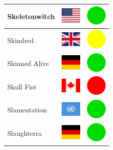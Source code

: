 \documentclass[12pt, a4paper, twoside]{report}
\begin{document}
\begin{center}
\begin{longtable}{|p{5cm}|p{2cm}|p{2cm}|}
 Skeletonwitch                                              & \includegraphics[width=1cm]{4x3/us} &   \includegraphics[width=1cm]{likes/y} \\ \hline
 Skindred                                                   & \includegraphics[width=1cm]{4x3/gb} &   \includegraphics[width=1cm]{likes/m} \\ \hline
 Skinned Alive                                              & \includegraphics[width=1cm]{4x3/de} &   \includegraphics[width=1cm]{likes/y} \\ \hline
 Skull Fist                                                 & \includegraphics[width=1cm]{4x3/ca} &   \includegraphics[width=1cm]{likes/n} \\ \hline
 Slamentation                                               & \includegraphics[width=1cm]{4x3/un} &   \includegraphics[width=1cm]{likes/y} \\ \hline
 Slaughterra                                                & \includegraphics[width=1cm]{4x3/de} &   \includegraphics[width=1cm]{likes/y} \\ \hline

\end{longtable}
\end{center}
\end{document}
